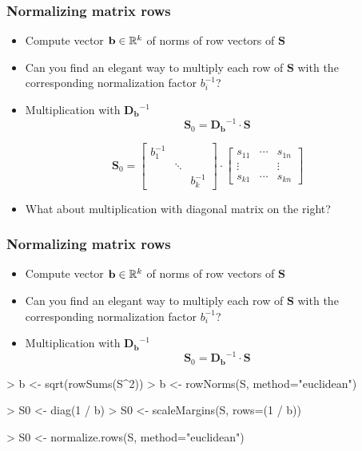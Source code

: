 \documentclass[t]{beamer} %
\begin{document}
\begin{frame}
  \frametitle{Normalizing matrix rows}
  
  \begin{itemize}
  \item Compute vector $\mathbf{b} \in \mathbb{R}^k$ of norms of row vectors of $\mathbf{S}$
  \item Can you find an elegant way to multiply each row of $\mathbf{S}$ with the corresponding normalization factor $b_i^{-1}$?
  \item<2-> Multiplication with  $\mathbf{D_b}^{-1}$
    \[
    \mathbf{S}_0 = \mathbf{D_b}^{-1} \cdot \mathbf{S}
    \]
  \end{itemize}
  
  \ungap[1]
  \[
  \mathbf{S}_0 =
  \begin{bmatrix}
    b_1^{-1} & & \\
    & \ddots & \\
    & & b_k^{-1}
  \end{bmatrix}
  \cdot
  \begin{bmatrix}
    s_{11} & \cdots & s_{1n} \\
    \vdots & & \vdots \\
    s_{k1} & \cdots & s_{kn}
  \end{bmatrix}
  \]

  \begin{itemize}
  \item[\hand] What about multiplication with diagonal matrix on the right?
  \end{itemize}
\end{frame}

\begin{frame}[fragile]
  \frametitle{Normalizing matrix rows}
  
  \begin{itemize}
  \item Compute vector $\mathbf{b} \in \mathbb{R}^k$ of norms of row vectors of $\mathbf{S}$
  \item Can you find an elegant way to multiply each row of $\mathbf{S}$ with the corresponding normalization factor $b_i^{-1}$?
  \item Multiplication with  $\mathbf{D_b}^{-1}$
    \[
    \mathbf{S}_0 = \mathbf{D_b}^{-1} \cdot \mathbf{S}
    \]
  \end{itemize}
  
\begin{Rcode}
> b <- sqrt(rowSums(S^2))
> b <- rowNorms(S, method="euclidean") 

> S0 <- diag(1 / b) %
> S0 <- scaleMargins(S, rows=(1 / b))  

> S0 <- normalize.rows(S, method="euclidean") 
\end{Rcode}
\end{frame}
\end{document}
